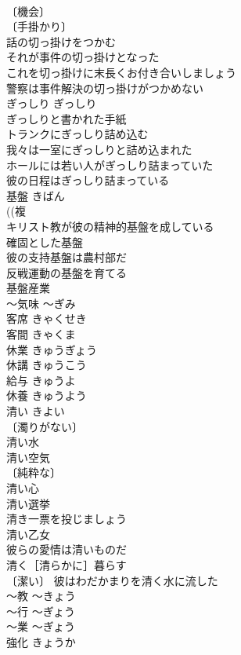 \documentclass[8pt]{extreport}
\begin{document}
\begin{CJK}{UTF8}{min}
\\	〔機会〕
\\	〔手掛かり〕
\\	話の切っ掛けをつかむ 
\\	それが事件の切っ掛けとなった 
\\	これを切っ掛けに末長くお付き合いしましょう 
\\	警察は事件解決の切っ掛けがつかめない 
\\	ぎっしり	ぎっしり	
\\	ぎっしりと書かれた手紙 
\\	トランクにぎっしり詰め込む 
\\	我々は一室にぎっしりと詰め込まれた 
\\	ホールには若い人がぎっしり詰まっていた 
\\	彼の日程はぎっしり詰まっている 
\\	基盤	きばん	
\\	((複
\\	キリスト教が彼の精神的基盤を成している 
\\	確固とした基盤 
\\	彼の支持基盤は農村部だ 
\\	反戦運動の基盤を育てる 
\\	基盤産業 
\\	～気味	～ぎみ	
\\	客席	きゃくせき	
\\	客間	きゃくま	
\\	休業	きゅうぎょう	
\\	休講	きゅうこう	
\\	給与	きゅうよ	
\\	休養	きゅうよう	
\\	清い	きよい	
\\	〔濁りがない〕
\\	清い水 
\\	清い空気 
\\	〔純粋な〕
\\	清い心 
\\	清い選挙 
\\	清き一票を投じましょう 
\\	清い乙女 
\\	彼らの愛情は清いものだ 
\\	清く［清らかに］暮らす 
\\	〔潔い〕 彼はわだかまりを清く水に流した 
\\	～教	～きょう	
\\	～行	～ぎょう	
\\	～業	～ぎょう	
\\	強化	きょうか	

\end{CJK}
\end{document}

